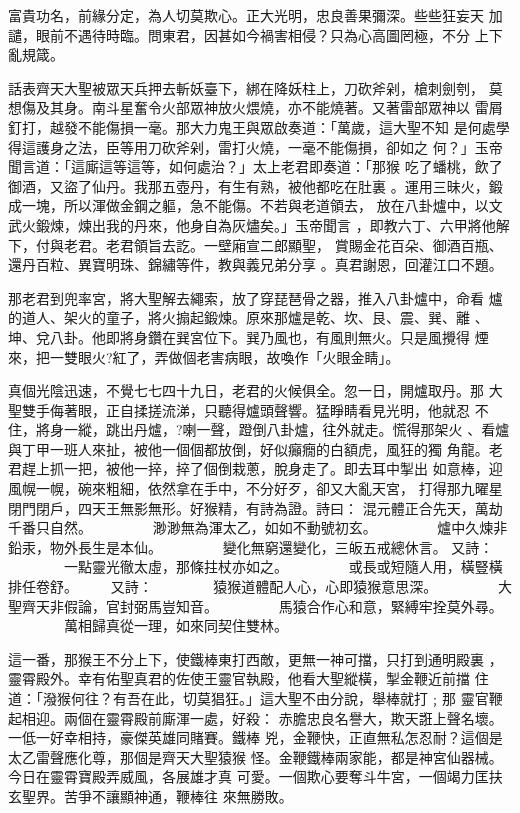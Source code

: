 \begin{pinyinscope}
{富貴功名，前緣分定，為人切莫欺心。正大光明，忠良善果彌深。些些狂妄天
加譴，眼前不遇待時臨。問東君，因甚如今禍害相侵？只為心高圖罔極，不分
上下亂規箴。

話表齊天大聖被眾天兵押去斬妖臺下，綁在降妖柱上，刀砍斧剁，槍刺劍刳，
莫想傷及其身。南斗星奮令火部眾神放火煨燒，亦不能燒著。又著雷部眾神以
雷屑釘打，越發不能傷損一毫。那大力鬼王與眾啟奏道：「萬歲，這大聖不知
是何處學得這護身之法，臣等用刀砍斧剁，雷打火燒，一毫不能傷損，卻如之
何？」玉帝聞言道：「這廝這等這等，如何處治？」太上老君即奏道：「那猴
吃了蟠桃，飲了御酒，又盜了仙丹。我那五壺丹，有生有熟，被他都吃在肚裏
。運用三昧火，鍛成一塊，所以渾做金鋼之軀，急不能傷。不若與老道領去，
放在八卦爐中，以文武火鍛煉，煉出我的丹來，他身自為灰燼矣。」玉帝聞言
，即教六丁、六甲將他解下，付與老君。老君領旨去訖。一壁廂宣二郎顯聖，
賞賜金花百朵、御酒百瓶、還丹百粒、異寶明珠、錦繡等件，教與義兄弟分享
。真君謝恩，回灌江口不題。

那老君到兜率宮，將大聖解去繩索，放了穿琵琶骨之器，推入八卦爐中，命看
爐的道人、架火的童子，將火搧起鍛煉。原來那爐是乾、坎、艮、震、巽、離
、坤、兌八卦。他即將身鑽在巽宮位下。巽乃風也，有風則無火。只是風攪得
煙來，把一雙眼火?紅了，弄做個老害病眼，故喚作「火眼金睛」。

真個光陰迅速，不覺七七四十九日，老君的火候俱全。忽一日，開爐取丹。那
大聖雙手侮著眼，正自揉搓流涕，只聽得爐頭聲響。猛睜睛看見光明，他就忍
不住，將身一縱，跳出丹爐，?喇一聲，蹬倒八卦爐，往外就走。慌得那架火
、看爐與丁甲一班人來扯，被他一個個都放倒，好似癲癇的白額虎，風狂的獨
角龍。老君趕上抓一把，被他一捽，捽了個倒栽蔥，脫身走了。即去耳中掣出
如意棒，迎風幌一幌，碗來粗細，依然拿在手中，不分好歹，卻又大亂天宮，
打得那九曜星閉門閉戶，四天王無影無形。好猴精，有詩為證。詩曰：
混元體正合先天，萬劫千番只自然。
　　　　渺渺無為渾太乙，如如不動號初玄。
　　　　爐中久煉非鉛汞，物外長生是本仙。
　　　　變化無窮還變化，三皈五戒總休言。
又詩：
　　　　一點靈光徹太虛，那條拄杖亦如之。
　　　　或長或短隨人用，橫豎橫排任卷舒。
　　又詩：
　　　　猿猴道體配人心，心即猿猴意思深。
　　　　大聖齊天非假論，官封弼馬豈知音。
　　　　馬猿合作心和意，緊縛牢拴莫外尋。
　　　　萬相歸真從一理，如來同契住雙林。

這一番，那猴王不分上下，使鐵棒東打西敵，更無一神可擋，只打到通明殿裏
，靈霄殿外。幸有佑聖真君的佐使王靈官執殿，他看大聖縱橫，掣金鞭近前擋
住道：「潑猴何往？有吾在此，切莫猖狂。」這大聖不由分說，舉棒就打﹔那
靈官鞭起相迎。兩個在靈霄殿前廝渾一處，好殺：
赤膽忠良名譽大，欺天誑上聲名壞。一低一好幸相持，豪傑英雄同賭賽。鐵棒
兇，金鞭快，正直無私怎忍耐？這個是太乙雷聲應化尊，那個是齊天大聖猿猴
怪。金鞭鐵棒兩家能，都是神宮仙器械。今日在靈霄寶殿弄威風，各展雄才真
可愛。一個欺心要奪斗牛宮，一個竭力匡扶玄聖界。苦爭不讓顯神通，鞭棒往
來無勝敗。

}
\end{pinyinscope}
